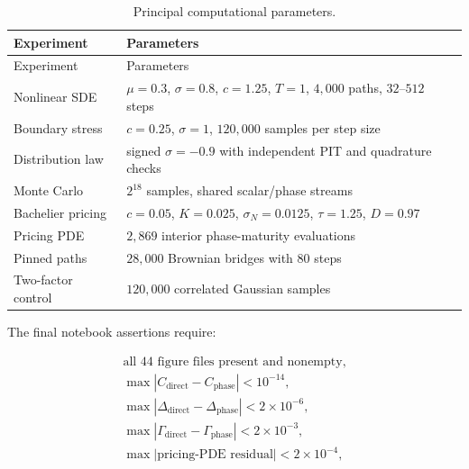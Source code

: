 \documentclass[
  english,
  10pt,
  letterpaper,
  DIV=11,
  numbers=noendperiod]{scrartcl}
\newcounter{none} %
\theoremstyle{definition}
\theoremstyle{plain}
\theoremstyle{plain}
\theoremstyle{remark}
\begin{document}
\begin{longtable}[]{@{}
  >{\raggedright\arraybackslash}p{}
  >{\raggedright\arraybackslash}p{}@{}}
\caption{Principal computational
parameters.}\label{tbl-computational-parameters}\tabularnewline
\toprule\noalign{}
\begin{minipage}[b]{\linewidth}\raggedright
Experiment
\end{minipage} & \begin{minipage}[b]{\linewidth}\raggedright
Parameters
\end{minipage} \\
\midrule\noalign{}
\endfirsthead
\toprule\noalign{}
\begin{minipage}[b]{\linewidth}\raggedright
Experiment
\end{minipage} & \begin{minipage}[b]{\linewidth}\raggedright
Parameters
\end{minipage} \\
\midrule\noalign{}
\endhead
\bottomrule\noalign{}
\endlastfoot
Nonlinear SDE & \(\mu=0.3\), \(\sigma=0.8\), \(c=1.25\), \(T=1\),
\(4{,}000\) paths, \(32\)--\(512\) steps \\
Boundary stress & \(c=0.25\), \(\sigma=1\), \(120{,}000\) samples per
step size \\
Distribution law & signed \(\sigma=-0.9\) with independent PIT and
quadrature checks \\
Monte Carlo & \(2^{18}\) samples, shared scalar/phase streams \\
Bachelier pricing & \(c=0.05\), \(K=0.025\), \(\sigma_N=0.0125\),
\(\tau=1.25\), \(D=0.97\) \\
Pricing PDE & \(2{,}869\) interior phase-maturity evaluations \\
Pinned paths & \(28{,}000\) Brownian bridges with \(80\) steps \\
Two-factor control & \(120{,}000\) correlated Gaussian samples \\
\end{longtable}

The final notebook assertions require:

\[
\begin{gathered}
\text{all 44 figure files present and nonempty},\\
\max|C_{\mathrm{direct}}-C_{\mathrm{phase}}|<10^{-14},\\
\max|\Delta_{\mathrm{direct}}-\Delta_{\mathrm{phase}}|<2\times10^{-6},\\
\max|\Gamma_{\mathrm{direct}}-\Gamma_{\mathrm{phase}}|<2\times10^{-3},\\
\max|\text{pricing-PDE residual}|<2\times10^{-4},
\end{gathered}
\]
\end{document}
